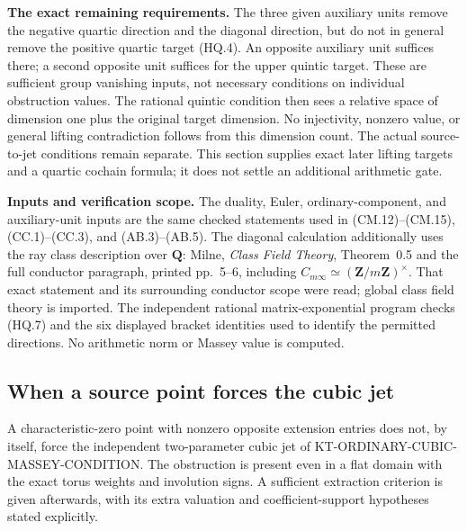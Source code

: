 \documentclass[11pt,a4paper]{article}
\theoremstyle{definition}
\renewcommand{\paragraph}[1]{\par\smallskip\noindent\textbf{#1}\quad\ignorespaces}
\begin{document}
\paragraph{The exact remaining requirements.}
The three given auxiliary units remove the negative
quartic direction and the diagonal direction, but
do not in general remove the positive quartic
target (HQ.4).  An opposite auxiliary unit suffices
there; a second opposite unit suffices for the
upper quintic target.  These are sufficient group
vanishing inputs, not necessary conditions on
individual obstruction values.  The rational
quintic condition then sees a relative space of
dimension one plus the original target dimension.
No injectivity, nonzero value, or general lifting
contradiction follows from this dimension count.
The actual source-to-jet conditions remain
separate.  This section supplies exact later
lifting targets and a quartic cochain formula;
it does not settle an additional arithmetic gate.

\paragraph{Inputs and verification scope.}
The duality, Euler, ordinary-component, and auxiliary-unit
inputs are the same checked statements used in
(CM.12)--(CM.15), (CC.1)--(CC.3), and (AB.3)--(AB.5).
The diagonal calculation additionally uses the ray class
description over \(\mathbf Q\): Milne,
\emph{Class Field Theory}, Theorem~0.5 and the full
conductor paragraph, printed pp.~5--6, including
\(C_{m\infty}\simeq(\mathbf Z/m\mathbf Z)^\times\).
That exact statement and its surrounding conductor
scope were read; global class field theory is imported.
The independent rational matrix-exponential program
checks (HQ.7) and the six displayed bracket identities
used to identify the permitted directions.
No arithmetic norm or Massey value is computed.



\subsection{When a source point forces the cubic jet}
\label{sec:kt-source-to-cubic-jet}

A characteristic-zero point with nonzero opposite extension
entries does not, by itself, force the independent two-parameter
cubic jet of KT-ORDINARY-CUBIC-MASSEY-CONDITION.
The obstruction is present even in a flat domain with the exact
torus weights and involution signs.  A sufficient extraction
criterion is given afterwards, with its extra valuation and
coefficient-support hypotheses stated explicitly.
\end{document}
